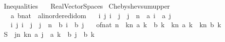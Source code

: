 %
\begin{isabellebody}%
%
%
\isadelimtheory
\isanewline
\isanewline
%
\endisadelimtheory
%
\isatagtheory
{}\isamarkupfalse%
\ Inequalities\isanewline
\ \ \ Real{\isacharunderscore}{\kern0pt}Vector{\isacharunderscore}{\kern0pt}Spaces\isanewline
{}%
\endisatagtheory
{\isafoldtheory}%
%
\isadelimtheory
\isanewline
%
\endisadelimtheory
\isanewline
{}\isamarkupfalse%
\ Chebyshev{\isacharunderscore}{\kern0pt}sum{\isacharunderscore}{\kern0pt}upper{\isacharcolon}{\kern0pt}\isanewline
\ \ \ a\ b{\isacharcolon}{\kern0pt}{\isacharcolon}{\kern0pt}{\isachardoublequoteopen}nat\ {\isasymRightarrow}\ {\isacharprime}{\kern0pt}a{\isacharcolon}{\kern0pt}{\isacharcolon}{\kern0pt}linordered{\isacharunderscore}{\kern0pt}idom{\isachardoublequoteclose}\isanewline
\ \ \ {\isachardoublequoteopen}{\isasymAnd}i\ j{\isachardot}{\kern0pt}\ i\ {\isasymle}\ j\ {\isasymLongrightarrow}\ j\ {\isacharless}{\kern0pt}\ n\ {\isasymLongrightarrow}\ a\ i\ {\isasymle}\ a\ j{\isachardoublequoteclose}\isanewline
\ \ \ {\isachardoublequoteopen}{\isasymAnd}i\ j{\isachardot}{\kern0pt}\ i\ {\isasymle}\ j\ {\isasymLongrightarrow}\ j\ {\isacharless}{\kern0pt}\ n\ {\isasymLongrightarrow}\ b\ i\ {\isasymge}\ b\ j{\isachardoublequoteclose}\isanewline
\ \ \ {\isachardoublequoteopen}of{\isacharunderscore}{\kern0pt}nat\ n\ {\isacharasterisk}{\kern0pt}\ {\isacharparenleft}{\kern0pt}{\isasymSum}k{\isacharequal}{\kern0pt}{}{\isachardot}{\kern0pt}{\isachardot}{\kern0pt}{\isacharless}{\kern0pt}n{\isachardot}{\kern0pt}\ a\ k\ {\isacharasterisk}{\kern0pt}\ b\ k{\isacharparenright}{\kern0pt}\ {\isasymle}\ {\isacharparenleft}{\kern0pt}{\isasymSum}k{\isacharequal}{\kern0pt}{}{\isachardot}{\kern0pt}{\isachardot}{\kern0pt}{\isacharless}{\kern0pt}n{\isachardot}{\kern0pt}\ a\ k{\isacharparenright}{\kern0pt}\ {\isacharasterisk}{\kern0pt}\ {\isacharparenleft}{\kern0pt}{\isasymSum}k{\isacharequal}{\kern0pt}{}{\isachardot}{\kern0pt}{\isachardot}{\kern0pt}{\isacharless}{\kern0pt}n{\isachardot}{\kern0pt}\ b\ k{\isacharparenright}{\kern0pt}{\isachardoublequoteclose}\isanewline
%
\isadelimproof
%
\endisadelimproof
%
\isatagproof
{}\isamarkupfalse%
\ {\isacharminus}{\kern0pt}\isanewline
\ \ \isamarkupfalse%
\ {\isacharquery}{\kern0pt}S\ {\isacharequal}{\kern0pt}\ {\isachardoublequoteopen}{\isacharparenleft}{\kern0pt}{\isasymSum}j{\isacharequal}{\kern0pt}{}{\isachardot}{\kern0pt}{\isachardot}{\kern0pt}{\isacharless}{\kern0pt}n{\isachardot}{\kern0pt}\ {\isacharparenleft}{\kern0pt}{\isasymSum}k{\isacharequal}{\kern0pt}{}{\isachardot}{\kern0pt}{\isachardot}{\kern0pt}{\isacharless}{\kern0pt}n{\isachardot}{\kern0pt}\ {\isacharparenleft}{\kern0pt}a\ j\ {\isacharminus}{\kern0pt}\ a\ k{\isacharparenright}{\kern0pt}\ {\isacharasterisk}{\kern0pt}\ {\isacharparenleft}{\kern0pt}b\ j\ {\isacharminus}{\kern0pt}\ b\ k{\isacharparenright}{\kern0pt}{\isacharparenright}{\kern0pt}{\isacharparenright}{\kern0pt}{\isachardoublequoteclose}\isanewline

\end{isabellebody}
